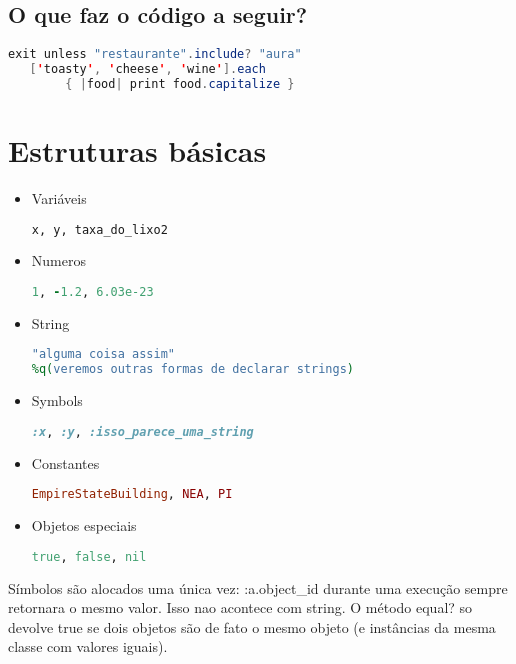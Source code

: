 \documentclass[serif,mathserif]{article}
\begin{document}
\subsection{O que faz o código a seguir?}
\begin{lstlisting}[language=java]
   exit unless "restaurante".include? "aura"
   ['toasty', 'cheese', 'wine'].each 
        { |food| print food.capitalize }
\end{lstlisting}


\section{Estruturas básicas}

\begin{itemize}
  \item Variáveis 
\begin{lstlisting}[language=ruby]
x, y, taxa_do_lixo2
\end{lstlisting} 
   \item{Numeros}
\begin{lstlisting}[language=ruby]
1, -1.2, 6.03e-23    
\end{lstlisting}
	\item {String}
\begin{lstlisting}[language=ruby]
"alguma coisa assim"
%q(veremos outras formas de declarar strings)
\end{lstlisting}
 
\end{itemize}

\begin{itemize}
  \item Symbols
\begin{lstlisting}[language=ruby]
:x, :y, :isso_parece_uma_string
\end{lstlisting}

  \item Constantes 
\begin{lstlisting}[language=ruby]  
EmpireStateBuilding, NEA, PI
\end{lstlisting}

  \item Objetos especiais 
\begin{lstlisting}[language=ruby]
true, false, nil
\end{lstlisting}
\end{itemize}

Símbolos são alocados uma única vez: :a.object\_id durante uma execução sempre
retornara o mesmo valor. Isso nao acontece com string. O método equal? so
devolve true se dois objetos são de fato o mesmo objeto (e instâncias da mesma
classe com valores iguais).
\end{document}
